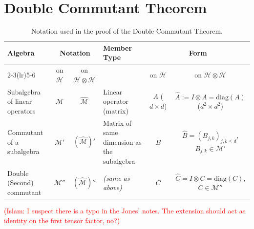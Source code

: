 \documentclass[12pt]{article}
\theoremstyle{plain}
\newcommand{\IslamNote}[1]{\textcolor{red}{(Islam: #1)}}
\newcommand{\IslamNote}[1]{}
\begin{document}
\newpage

\section{Double Commutant Theorem}

\begin{table}[h!]
\centering
\renewcommand{\arraystretch}{1.3}
\begin{tabular}{@{}p{3cm}ccp{3.2cm}cc@{}}
\toprule
\textbf{Algebra} 
& \multicolumn{2}{c}{\textbf{Notation}} 
& \textbf{Member Type} 
& \multicolumn{2}{c}{\textbf{Form}} \\

\cmidrule(lr){2-3}\cmidrule(lr){5-6}
& on $\mathcal{H}$ & on $\mathcal{H} \otimes \mathcal{H}$ 
& & on $\mathcal{H}$ & on $\mathcal{H} \otimes \mathcal{H}$ \\
\midrule

Subalgebra of linear operators 
& $\mathcal{M}$ 
& $\widehat{\mathcal{M}}$ 
& Linear operator (matrix) 
& $A$ ($d\times d$) 
& $\widehat{A} := I \otimes A = \text{diag}(A)$ ($d^2\times d^2$) \\

Commutant of a subalgebra 
& $\mathcal{M}'$ 
& $(\widehat{\mathcal{M}})'$ 
& Matrix of same dimension as the subalgebra 
& $B$ 
& $\widehat{B} = (B_{j,k})_{j,k\le d}$, $B_{j,k}\in \mathcal{M}'$ \\

Double (Second) commutant 
& $\mathcal{M}''$ 
& $(\widehat{\mathcal{M}})''$ 
& \textit{(same as above)} 
& $C$ 
& $\widehat{C} = I \otimes C = \mathrm{diag}(C)$, $C\in\mathcal{M}''$ \\
\bottomrule
\end{tabular}
\caption{Notation used in the proof of the Double Commutant Theorem.}
\label{tab:notation-commutator-proof}
\end{table}

\IslamNote{I suspect there is a typo in the Jones' notes. The extension should act as identity on the first tensor factor, no?}

        
\end{document}
